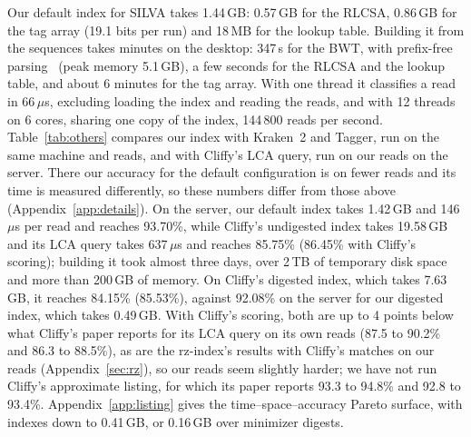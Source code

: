 Our default index for SILVA takes 1.44\,GB: 0.57\,GB for the RLCSA, 0.86\,GB for the tag array (19.1 bits per run) and 18\,MB for the lookup table.
Building it from the sequences takes minutes on the desktop: 347\,s for the BWT, with prefix-free parsing~\cite{BoucherEtAl2019} (peak memory 5.1\,GB), a few seconds for the RLCSA and the lookup table, and about 6 minutes for the tag array.
With one thread it classifies a read in 66\,$\mu$s, excluding loading the index and reading the reads, and with 12 threads on 6 cores, sharing one copy of the index, 144\,800 reads per second.
Table~\ref{tab:others} compares our index with Kraken~2 and Tagger, run on the same machine and reads, and with Cliffy's LCA query, run on our reads on the server.
There our accuracy for the default configuration is on fewer reads and its time is measured differently, so these numbers differ from those above (Appendix~\ref{app:details}).
On the server, our default index takes 1.42\,GB and 146\,$\mu$s per read and reaches 93.70\%, while Cliffy's undigested index takes 19.58\,GB and its LCA query takes 637\,$\mu$s and reaches 85.75\% (86.45\% with Cliffy's scoring); building it took almost three days, over 2\,TB of temporary disk space and more than 200\,GB of memory.
On Cliffy's digested index, which takes 7.63\,GB, it reaches 84.15\% (85.53\%), against 92.08\% on the server for our digested index, which takes 0.49\,GB.
With Cliffy's scoring, both are up to 4 points below what Cliffy's paper reports for its LCA query on its own reads (87.5 to 90.2\% and 86.3 to 88.5\%), as are the rz-index's results with Cliffy's matches on our reads (Appendix~\ref{sec:rz}), so our reads seem slightly harder; we have not run Cliffy's approximate listing, for which its paper reports 93.3 to 94.8\% and 92.8 to 93.4\%.
Appendix~\ref{app:listing} gives the time--space--accuracy Pareto surface, with indexes down to 0.41\,GB, or 0.16\,GB over minimizer digests.

